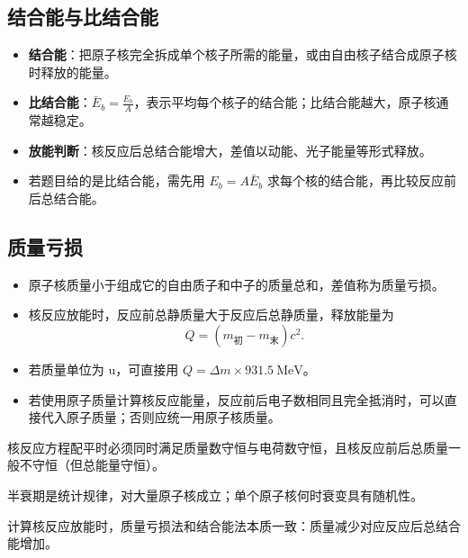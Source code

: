 \subsection{结合能与比结合能}
\begin{keypointbox}[title={\strut\textcolor{white}{\bfseries 重点知识点：结合能}}]
\begin{itemize}[leftmargin=1.5em]
  \item \textbf{结合能}：把原子核完全拆成单个核子所需的能量，或由自由核子结合成原子核时释放的能量。
  \item \textbf{比结合能}：$\bar E_b=\frac{E_b}{A}$，表示平均每个核子的结合能；比结合能越大，原子核通常越稳定。
  \item \textbf{放能判断}：核反应后总结合能增大，差值以动能、光子能量等形式释放。
  \item 若题目给的是比结合能，需先用 $E_b=A\bar E_b$ 求每个核的结合能，再比较反应前后总结合能。
\end{itemize}
\end{keypointbox}

\subsection{质量亏损}
\begin{keypointbox}[title={\strut\textcolor{white}{\bfseries 重点知识点：质量亏损}}]
\begin{itemize}[leftmargin=1.5em]
  \item 原子核质量小于组成它的自由质子和中子的质量总和，差值称为质量亏损。
  \item 核反应放能时，反应前总静质量大于反应后总静质量，释放能量为
        \[
          Q=(m_{\text{初}}-m_{\text{末}})c^2.
        \]
  \item 若质量单位为 $\mathrm{u}$，可直接用 $Q=\Delta m\times 931.5\ \mathrm{MeV}$。
  \item 若使用原子质量计算核反应能量，反应前后电子数相同且完全抵消时，可以直接代入原子质量；否则应统一用原子核质量。
\end{itemize}
\end{keypointbox}

\begin{formulanotebox}
核反应方程配平时必须同时满足质量数守恒与电荷数守恒，且核反应前后总质量一般不守恒（但总能量守恒）。

半衰期是统计规律，对大量原子核成立；单个原子核何时衰变具有随机性。

计算核反应放能时，质量亏损法和结合能法本质一致：质量减少对应反应后总结合能增加。
\end{formulanotebox}

